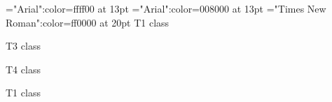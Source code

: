 \font\tdtcta="Arial":color=ffff00 at 13pt
\font\tcta="Arial":color=008000 at 13pt
\font\ta="Times New Roman":color=ff0000 at 20pt
\ta T1 class 

\tcta T3 class 

\tdtcta T4 class 

\ta T1 class 


\bye
